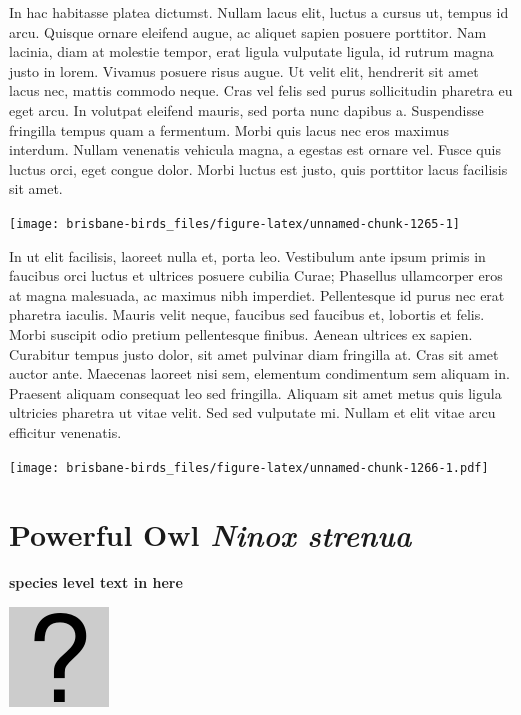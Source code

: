 \documentclass[]{book}
\let\origfigure\figure
\let\endorigfigure\endfigure
\renewenvironment{figure}[1][2] {
  \expandafter\origfigure\expandafter[H]
} {
  \endorigfigure
}
\begin{document}
In hac habitasse platea dictumst. Nullam lacus elit, luctus a cursus ut,
tempus id arcu. Quisque ornare eleifend augue, ac aliquet sapien posuere
porttitor. Nam lacinia, diam at molestie tempor, erat ligula vulputate
ligula, id rutrum magna justo in lorem. Vivamus posuere risus augue. Ut
velit elit, hendrerit sit amet lacus nec, mattis commodo neque. Cras vel
felis sed purus sollicitudin pharetra eu eget arcu. In volutpat eleifend
mauris, sed porta nunc dapibus a. Suspendisse fringilla tempus quam a
fermentum. Morbi quis lacus nec eros maximus interdum. Nullam venenatis
vehicula magna, a egestas est ornare vel. Fusce quis luctus orci, eget
congue dolor. Morbi luctus est justo, quis porttitor lacus facilisis sit
amet.

\begin{figure}
\texttt{[image: brisbane-birds\_files/figure-latex/unnamed-chunk-1265-1]} \caption{insert figure caption}\label{fig:unnamed-chunk-1265}
\end{figure}

In ut elit facilisis, laoreet nulla et, porta leo. Vestibulum ante ipsum
primis in faucibus orci luctus et ultrices posuere cubilia Curae;
Phasellus ullamcorper eros at magna malesuada, ac maximus nibh
imperdiet. Pellentesque id purus nec erat pharetra iaculis. Mauris velit
neque, faucibus sed faucibus et, lobortis et felis. Morbi suscipit odio
pretium pellentesque finibus. Aenean ultrices ex sapien. Curabitur
tempus justo dolor, sit amet pulvinar diam fringilla at. Cras sit amet
auctor ante. Maecenas laoreet nisi sem, elementum condimentum sem
aliquam in. Praesent aliquam consequat leo sed fringilla. Aliquam sit
amet metus quis ligula ultricies pharetra ut vitae velit. Sed sed
vulputate mi. Nullam et elit vitae arcu efficitur venenatis.

\begin{figure}
\centering
\texttt{[image: brisbane-birds\_files/figure-latex/unnamed-chunk-1266-1.pdf]}
\caption{\label{fig:unnamed-chunk-1266}insert figure caption}
\end{figure}

\section{\texorpdfstring{Powerful Owl \emph{Ninox
strenua}}{Powerful Owl Ninox strenua}}\label{powerful-owl-ninox-strenua}

\textbf{species level text in here}

\begin{figure}
\centering
\includegraphics{assets/missing.png}
\caption{No image for species}
\end{figure}
\end{document}
